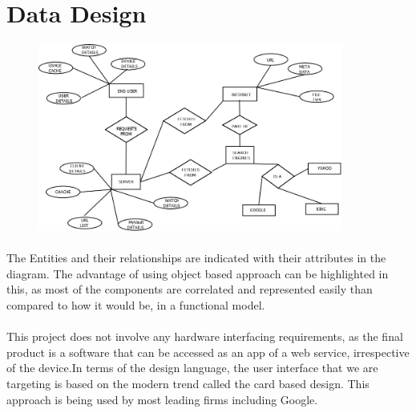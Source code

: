 \documentclass[a4paper]{report}
\begin{document}
\section{Data Design}
\begin{center}

\begin{figure}
\includegraphics[width=10.0cm]{MagPy_Entity.png} 
\end{figure}

\end{center}

\paragraph{}
\large\textnormal{The Entities and their relationships are indicated with their attributes in the diagram. The advantage of using object based approach can be highlighted in this, as most of the components are correlated and represented easily than compared to how it would be, in a functional model.}

\paragraph{}
\large\textnormal{This project does not involve any hardware interfacing requirements, as the final product is a software that can be accessed as an app of a web service, irrespective of the device.In terms of the design language, the user interface that we are targeting is based on the modern trend called the card based design. This approach is being used by most leading firms including Google.}
\end{document}
